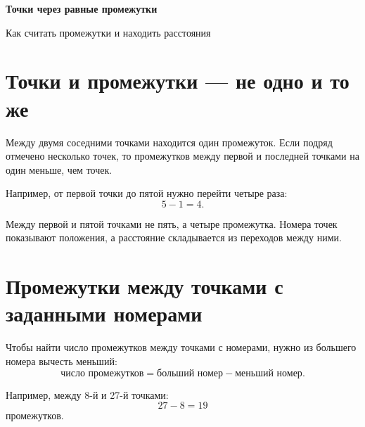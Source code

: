 
\begin{center}
  {\fontsize{25}{30}\selectfont\bfseries\sffamily\color{Primary}
    Точки через равные промежутки}

  \vspace{0.3em}

  {\large\sffamily\color{GrayText}
    Как считать промежутки и находить расстояния}
\end{center}

\vspace{0.45em}

\section{Точки и промежутки --- не одно и то же}

\equalpointsbasic

\begin{propertybox}
  Между двумя соседними точками находится один промежуток. Если подряд
  отмечено несколько точек, то промежутков между первой и последней точками
  на один меньше, чем точек.
\end{propertybox}

\pointsvsintervalsfigure

Например, от первой точки до пятой нужно перейти четыре раза:
\[
  5-1=4.
\]

\begin{warningbox}
  Между первой и пятой точками не пять, а четыре промежутка. Номера точек
  показывают положения, а расстояние складывается из переходов между ними.
\end{warningbox}

\section{Промежутки между точками с заданными номерами}

\numberdifferencefigure

\begin{conclusionbox}[Правило]
  Чтобы найти число промежутков между точками с номерами, нужно из большего
  номера вычесть меньший:
  \[
    \text{число промежутков}
      =\text{больший номер}-\text{меньший номер}.
  \]
\end{conclusionbox}

Например, между 8-й и 27-й точками:
\[
  27-8=19
\]
промежутков.

